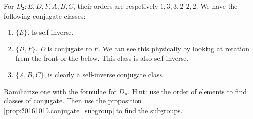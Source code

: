 \begin{ex}
    For $D_3: E,D,F,A,B,C$, their orders are respetively
    $1,3,3,2,2,2$. We have the following conjugate classes:
    \begin{enumerate}
        \item $\{ E\}$. Is self inverse.
        \item $\{ D,F\}$. $D$ is conjugate to $F$. We can see
            this physically by looking at rotation from the front
            or the below. This class is also self-inverse.
        \item $\{A,B,C\}$, is clearly a self-inverse conjugate
            class.
    \end{enumerate}
\end{ex}
\begin{ex}[$D_6$]
    Ramiliarize one with the formulae for $D_n$. Hint: use the order of
    elements to find classes of conjugate. Then use the proposition
    \ref{prop:20161010.conjugate_subgroup} to find the subgroups.
\end{ex}





